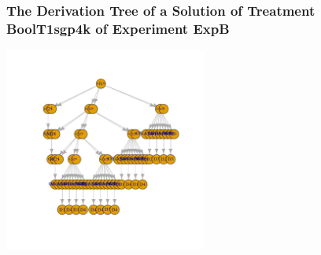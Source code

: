  \begin{frame}
 \frametitle{ The Derivation Tree of a Solution of Treatment BoolT1sgp4k of Experiment ExpB }
 \begin{center}
\includegraphics[width=0.5\textwidth, angle=0]
{ExpBDerivationTreeFigure007.pdf}
 \end{center}
 \label{report/ExpBDerivationTreeFigure007.pdf}  
 \end{frame}

